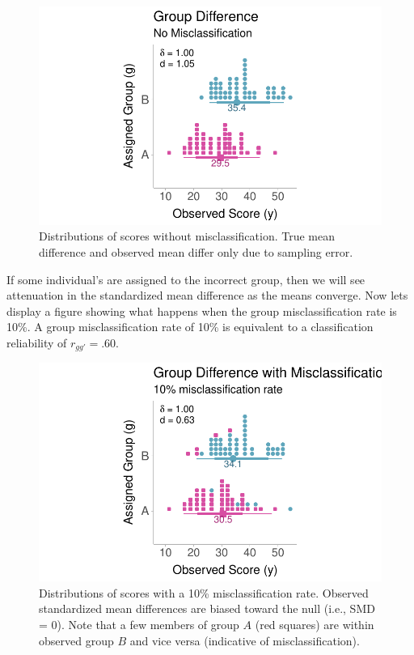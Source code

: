 \documentclass[
  letterpaper,
  DIV=11,
  numbers=noendperiod]{scrreprt}
\begin{document}
\begin{figure}

{\centering \includegraphics{misclassification_files/figure-pdf/unnamed-chunk-4-1.pdf}

}

\caption{Distributions of scores without misclassification. True mean
difference and observed mean differ only due to sampling error.}

\end{figure}

If some individual's are assigned to the incorrect group, then we will
see attenuation in the standardized mean difference as the means
converge. Now lets display a figure showing what happens when the group
misclassification rate is 10\%. A group misclassification rate of 10\%
is equivalent to a classification reliability of \(r_{gg'}=.60\).

\begin{figure}

{\centering \includegraphics{misclassification_files/figure-pdf/unnamed-chunk-5-1.pdf}

}

\caption{Distributions of scores with a 10\% misclassification rate.
Observed standardized mean differences are biased toward the null (i.e.,
SMD = 0). Note that a few members of group \(A\) (red squares) are
within observed group \(B\) and vice versa (indicative of
misclassification).}

\end{figure}
\end{document}
